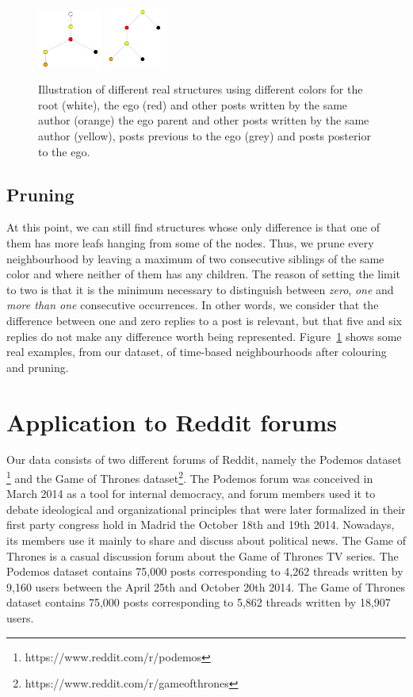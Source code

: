 \documentclass[conference]{IEEEtran}
\begin{document}
\begin{figure}
\centering
\includegraphics[width=0.19\textwidth]{neighbourhood_time_456}
\includegraphics[width=0.18\textwidth]{neighbourhood_time_501}
\caption{Illustration of different real structures using different colors for the root (white), the ego (red) and other posts written by the same author (orange) the ego parent and other posts written by the same author (yellow), posts previous to the ego (grey) and posts posterior to the ego.}
\label{fig:colors}
\end{figure}

\subsection{Pruning}
At this point, we can still find structures whose only difference is that one of them has more leafs hanging from some of the nodes. Thus, we prune every neighbourhood by leaving a maximum of two consecutive siblings of the same color and where neither of them has any children. The reason of setting the limit to two is that it is the minimum necessary to distinguish between \textit{zero}, \textit{one} and \textit{more than one} consecutive occurrences. In other words, we consider that the difference between one and zero replies to a post is relevant, but that five and six replies do not make any difference worth being represented.    
Figure~\ref{fig:colors} shows some real examples, from our dataset, of time-based neighbourhoods after colouring and pruning.

\section{Application to Reddit forums}
Our data consists of two different forums of Reddit, namely the Podemos dataset \footnote{https://www.reddit.com/r/podemos} and the Game of Thrones dataset\footnote{https://www.reddit.com/r/gameofthrones}. The Podemos forum was conceived in March 2014 as a tool for internal democracy, and forum members used it to debate ideological and organizational principles that were later formalized in their first party congress hold in Madrid the October 18th and 19th 2014. Nowadays, its members use it mainly to share and discuss about political news. The Game of Thrones is a casual discussion forum about the Game of Thrones TV series.
The Podemos dataset contains 75,000 posts corresponding to 4,262 threads written by 9,160 users between the April 25th and October 20th 2014. The Game of Thrones dataset contains 75,000 posts corresponding to 5,862 threads written by 18,907 users.
\end{document}
